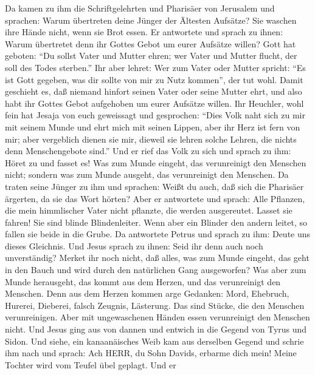  Da kamen zu ihm die Schriftgelehrten und Pharisäer von
Jerusalem und sprachen:  Warum übertreten deine Jünger der
Ältesten Aufsätze? Sie waschen ihre Hände nicht, wenn sie Brot essen.
 Er antwortete und sprach zu ihnen: Warum übertretet denn
ihr Gottes Gebot um eurer Aufsätze willen?  Gott hat
geboten: ``Du sollst Vater und Mutter ehren; wer Vater und Mutter
flucht, der soll des Todes sterben.''  Ihr aber lehret: Wer
zum Vater oder Mutter spricht: ``Es ist Gott gegeben, was dir sollte von
mir zu Nutz kommen'', der tut wohl.  Damit geschieht es, daß
niemand hinfort seinen Vater oder seine Mutter ehrt, und also habt ihr
Gottes Gebot aufgehoben um eurer Aufsätze willen.  Ihr
Heuchler, wohl fein hat Jesaja von euch geweissagt und gesprochen:
 ``Dies Volk naht sich zu mir mit seinem Munde und ehrt mich
mit seinen Lippen, aber ihr Herz ist fern von mir;  aber
vergeblich dienen sie mir, dieweil sie lehren solche Lehren, die nichts
denn Menschengebote sind.''  Und er rief das Volk zu sich
und sprach zu ihm: Höret zu und fasset es!  Was zum Munde
eingeht, das verunreinigt den Menschen nicht; sondern was zum Munde
ausgeht, das verunreinigt den Menschen.  Da traten seine
Jünger zu ihm und sprachen: Weißt du auch, daß sich die Pharisäer
ärgerten, da sie das Wort hörten?  Aber er antwortete und
sprach: Alle Pflanzen, die mein himmlischer Vater nicht pflanzte, die
werden ausgereutet.  Lasset sie fahren! Sie sind blinde
Blindenleiter. Wenn aber ein Blinder den andern leitet, so fallen sie
beide in die Grube.  Da antwortete Petrus und sprach zu
ihm: Deute uns dieses Gleichnis.  Und Jesus sprach zu
ihnen: Seid ihr denn auch noch unverständig?  Merket ihr
noch nicht, daß alles, was zum Munde eingeht, das geht in den Bauch und
wird durch den natürlichen Gang ausgeworfen?  Was aber zum
Munde herausgeht, das kommt aus dem Herzen, und das verunreinigt den
Menschen.  Denn aus dem Herzen kommen arge Gedanken: Mord,
Ehebruch, Hurerei, Dieberei, falsch Zeugnis, Lästerung. 
Das sind Stücke, die den Menschen verunreinigen. Aber mit ungewaschenen
Händen essen verunreinigt den Menschen nicht.  Und Jesus
ging aus von dannen und entwich in die Gegend von Tyrus und Sidon.
 Und siehe, ein kanaanäisches Weib kam aus derselben Gegend
und schrie ihm nach und sprach: Ach HERR, du Sohn Davids, erbarme dich
mein! Meine Tochter wird vom Teufel übel geplagt.  Und er
